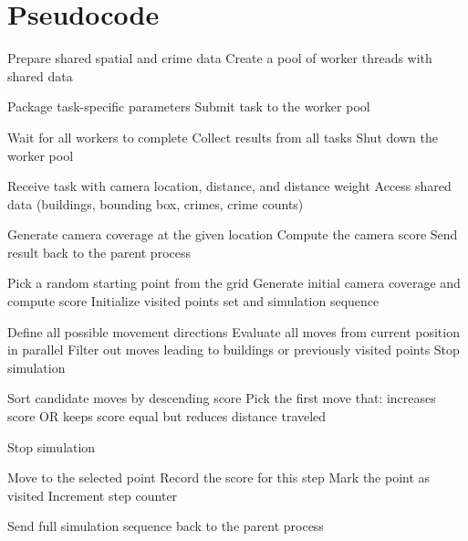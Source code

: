 \section{Pseudocode}

\begin{algorithm}
[!htb]
\caption{Worker pool setup pseudocode}
\label{pseudo:setup}
\begin{algorithmic}
  [1] \STATE Prepare shared spatial and crime data \STATE Create a pool of worker
  threads with shared data

   \STATE Package task-specific parameters \STATE
  Submit task to the worker pool \ENDFOR

  \STATE Wait for all workers to complete \STATE Collect results from all
  tasks \STATE Shut down the worker pool
\end{algorithmic}
\end{algorithm}

\begin{algorithm}
[htb!]
\caption{Bruteforce pseudocode}
\label{pseudo:bruteforce}
\begin{algorithmic}
  [1] \STATE Receive task with camera location, distance, and distance weight
  \STATE Access shared data (buildings, bounding box, crimes, crime counts)

  \STATE Generate camera coverage at the given location \STATE Compute the camera
  score \STATE Send result back to the parent process
\end{algorithmic}
\end{algorithm}

\begin{algorithm}
[htb!]
\caption{Hillclimb pseudocode}
\label{pseudo:hillclimb}
\begin{algorithmic}
  [1]

\STATE Pick a random starting point from the grid 
\STATE Generate initial camera coverage and compute score 
\STATE Initialize visited points set and simulation sequence

        \STATE Define all possible movement directions 
        \STATE Evaluate all moves from current position in parallel
        \STATE Filter out moves leading to buildings or previously visited points
                \STATE Stop simulation 
            \ENDIF

        \STATE Sort candidate moves by descending score 
        \STATE Pick the first move that: 
            \STATE \quad increases score OR 
            \STATE \quad keeps score equal but reduces distance traveled

            \STATE Stop simulation 
        \ENDIF

        \STATE Move to the selected point 
        \STATE Record the score for this step
        \STATE Mark the point as visited 
        \STATE Increment step counter 
    \ENDWHILE

    \STATE Send full simulation sequence back to the parent process
\end{algorithmic}
\end{algorithm}

